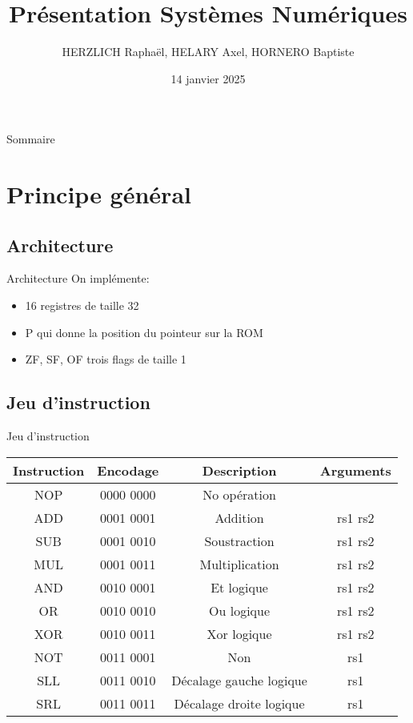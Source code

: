 \documentclass{beamer}
\title{Présentation Systèmes Numériques}
\date{14 janvier 2025}
\author{HERZLICH Raphaël, HELARY Axel, HORNERO Baptiste}
\begin{document}
    \frame{\titlepage}

    \begin{frame}{Sommaire}
        \tableofcontents[hideallsubsections]
    \end{frame}


\section{Principe général}
    \begin{frame}
    \end{frame}

    \subsection{Architecture}
    \begin{frame}{Architecture}
        On implémente:
        \begin{itemize}
            \item 16 registres de taille 32
            \item P qui donne la position du pointeur sur la ROM
            \item ZF, SF, OF trois flags de taille 1
        \end{itemize}
    \end{frame}

    \subsection{Jeu d'instruction}
    \begin{frame}{Jeu d'instruction}

        \begin{tabular}{| c || c || c | c |}
            Instruction & Encodage & Description & Arguments\\ \hline
            NOP & 0000 0000 & No opération &\\ \hline
            ADD & 0001 0001 & Addition & rs1 rs2\\ \hline
            SUB & 0001 0010 & Soustraction & rs1 rs2 \\ \hline
            MUL & 0001 0011 & Multiplication & rs1 rs2 \\ \hline
            AND & 0010 0001 & Et logique & rs1 rs2\\ \hline
            OR  & 0010 0010 & Ou logique & rs1 rs2\\ \hline
            XOR & 0010 0011 & Xor logique & rs1 rs2\\ \hline
            NOT & 0011 0001 & Non & rs1\\ \hline
            SLL & 0011 0010 & Décalage gauche logique & rs1 \\ \hline
            SRL & 0011 0011 & Décalage droite logique & rs1\\ \hline
        \end{tabular}
    \end{frame}
\end{document}
